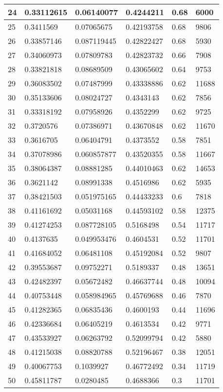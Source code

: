 \begin{longtable}{|l|l|l|l|l|l|}
24 & 0.33112615 & 0.06140077 & 0.4244211 & 0.68 & 6000 \\ \hline 
25 & 0.3411569 & 0.07065675 & 0.42193758 & 0.68 & 9806 \\ \hline 
26 & 0.33857146 & 0.087119445 & 0.42822427 & 0.68 & 5930 \\ \hline 
27 & 0.34060973 & 0.07809783 & 0.42823732 & 0.66 & 7908 \\ \hline 
28 & 0.33821818 & 0.08689509 & 0.43065602 & 0.64 & 9753 \\ \hline 
29 & 0.36083502 & 0.07487999 & 0.43338886 & 0.62 & 11688 \\ \hline 
30 & 0.35133606 & 0.08024727 & 0.4343143 & 0.62 & 7856 \\ \hline 
31 & 0.33318192 & 0.07958926 & 0.4352299 & 0.62 & 9725 \\ \hline 
32 & 0.3720576 & 0.07386971 & 0.43670848 & 0.62 & 11670 \\ \hline 
33 & 0.3616705 & 0.06404791 & 0.4373552 & 0.58 & 7851 \\ \hline 
34 & 0.37078986 & 0.060857877 & 0.43520355 & 0.58 & 11667 \\ \hline 
35 & 0.38064387 & 0.08881285 & 0.44010463 & 0.62 & 14653 \\ \hline 
36 & 0.3621142 & 0.08991338 & 0.4516986 & 0.62 & 5935 \\ \hline 
37 & 0.38421503 & 0.051975165 & 0.44433233 & 0.6 & 7818 \\ \hline 
38 & 0.41161692 & 0.05031168 & 0.44593102 & 0.58 & 12375 \\ \hline 
39 & 0.41274253 & 0.087728105 & 0.5168498 & 0.54 & 11717 \\ \hline 
40 & 0.4137635 & 0.049953476 & 0.4604531 & 0.52 & 11701 \\ \hline 
41 & 0.41684052 & 0.06481108 & 0.45192084 & 0.52 & 9807 \\ \hline 
42 & 0.39553687 & 0.09752271 & 0.5189337 & 0.48 & 13651 \\ \hline 
43 & 0.42482397 & 0.05672482 & 0.46637744 & 0.48 & 10094 \\ \hline 
44 & 0.40753448 & 0.058984965 & 0.45769688 & 0.46 & 7870 \\ \hline 
45 & 0.41282365 & 0.06835436 & 0.4600193 & 0.44 & 11696 \\ \hline 
46 & 0.42336684 & 0.06405219 & 0.4613534 & 0.42 & 9771 \\ \hline 
47 & 0.43533927 & 0.06263792 & 0.52099794 & 0.42 & 5880 \\ \hline 
48 & 0.41215038 & 0.08820788 & 0.52196467 & 0.38 & 12051 \\ \hline 
49 & 0.40067753 & 0.1039927 & 0.46772492 & 0.34 & 11719 \\ \hline 
50 & 0.45811787 & 0.0280485 & 0.4688366 & 0.3 & 11701 \\ \hline 
\end{longtable}